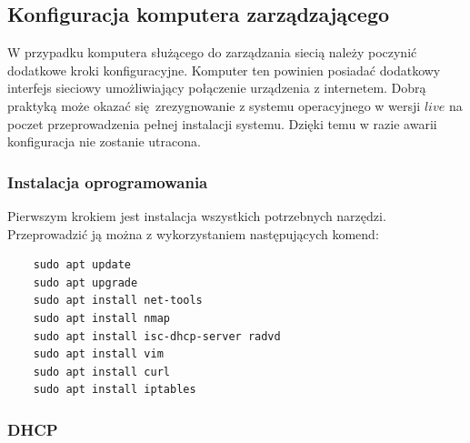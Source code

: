 \documentclass[polish,envcountsect,10pt]{article}
\begin{document}
\subsection{Konfiguracja komputera zarządzającego}

W przypadku komputera służącego do zarządzania siecią należy poczynić dodatkowe kroki konfiguracyjne. Komputer ten powinien posiadać dodatkowy interfejs sieciowy umożliwiający połączenie urządzenia z internetem. Dobrą praktyką może okazać się zrezygnowanie z systemu operacyjnego w wersji $live$ na poczet przeprowadzenia pełnej instalacji systemu. Dzięki temu w razie awarii konfiguracja nie zostanie utracona.

\subsubsection{Instalacja oprogramowania}

Pierwszym krokiem jest instalacja wszystkich potrzebnych narzędzi. Przeprowadzić ją można z wykorzystaniem następujących komend:
\begin{verbatim}
	sudo apt update
	sudo apt upgrade
	sudo apt install net-tools 
	sudo apt install nmap
	sudo apt install isc-dhcp-server radvd
	sudo apt install vim
	sudo apt install curl
	sudo apt install iptables
\end{verbatim}

\subsubsection{DHCP}
\end{document}
